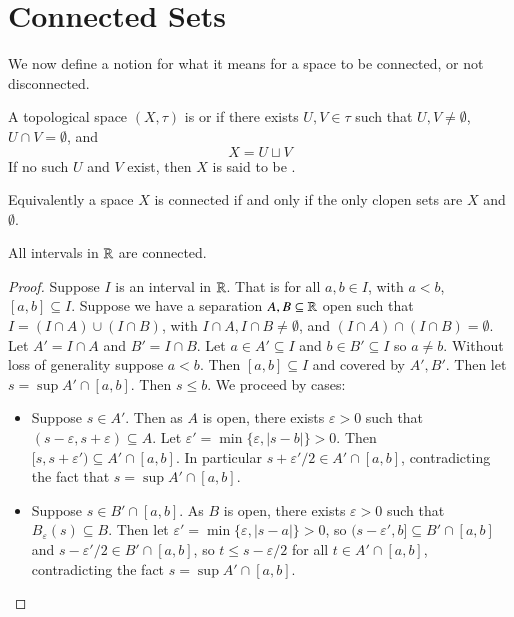 \section{Connected Sets}


We now define a notion for what it means for a space to be connected, or not disconnected.

\begin{defn}
    A topological space $(X,\tau)$ is  or  if there exists $U,V \in \tau$ such that $U,V\neq \emptyset$, $U\cap V = \emptyset$, and $$X = U\sqcup V$$
    If no such $U$ and $V$ exist, then $X$ is said to be .
\end{defn}

Equivalently a space $X$ is connected if and only if the only clopen sets are $X$ and $\emptyset$.

\begin{prop}\label{prop:3.1.6}
    All intervals in $\mathbb R$ are connected.
\end{prop}
\begin{proof}
    Suppose $I$ is an interval in $\mathbb R$. That is for all $a, b \in I$, with $a < b$, $[a,b] \subseteq I$. Suppose we have a separation $A, B \subseteq \mathbb R$ open such that $I = (I\cap A)\cup(I\cap B)$, with $I\cap A,I\cap B \neq \emptyset$, and $(I\cap A)\cap (I\cap B) = \emptyset$. Let $A' = I\cap A$ and $B' = I\cap B$. Let $a \in A' \subseteq I$ and $b \in B' \subseteq I$ so $a \neq b$. Without loss of generality suppose $a < b$. Then $[a,b] \subseteq I$ and covered by $A',B'$. Then let $s = \sup A'\cap [a,b]$. Then $s \leq b$. We proceed by cases:
    \begin{itemize}
        \item Suppose $s \in A'$. Then as $A$ is open, there exists $\varepsilon > 0$ such that $(s-\varepsilon,s+\varepsilon) \subseteq A$. Let $\varepsilon' = \min\{\varepsilon,|s-b|\} > 0$. Then $[s,s+\varepsilon') \subseteq A'\cap [a,b]$. In particular $s+\varepsilon'/2 \in A'\cap [a,b]$, contradicting the fact that $s = \sup A'\cap [a,b]$.
        \item Suppose $s \in B'\cap [a,b]$. As $B$ is open, there exists $\varepsilon > 0$ such that $B_{\varepsilon}(s) \subseteq B$. Then let $\varepsilon' = \min\{\varepsilon,|s-a|\} > 0$, so $(s-\varepsilon',b] \subseteq B'\cap [a,b]$ and $s - \varepsilon'/2 \in B'\cap [a,b]$, so $t \leq s-\varepsilon/2$ for all $t \in A'\cap [a,b]$, contradicting the fact $s = \sup A'\cap [a,b]$.
    \end{itemize}
\end{proof}

